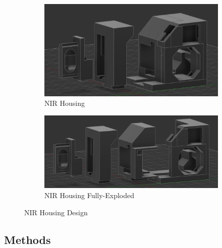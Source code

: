 \documentclass[final, 3p, 11pt]{elsarticle}
\begin{document}
\begin{figure}[ht]
        \centering
        \begin{subfigure}[b]{0.42\textwidth}
            \centering
            \includegraphics[width=\textwidth]{Images/nir_housing.png}  %
            \caption{NIR Housing}
            \label{fig:nir_subfig1}
        \end{subfigure}
        \hfill
        \begin{subfigure}[b]{0.54\textwidth}
            \centering
            \includegraphics[width=\textwidth]{Images/nir_exploded.png}  %
            \caption{NIR Housing Fully-Exploded}
            \label{fig:nir_subfig2}
        \end{subfigure}
        \caption{NIR Housing Design}
        \label{fig:nir_housing}
    \end{figure}

\subsection{Methods}
\end{document}
